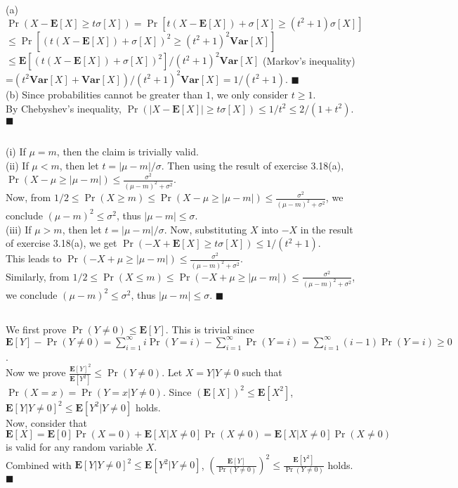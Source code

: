 \documentclass{article}
\begin{document}
\subsection{}
(a) $\Pr(X-\textbf{E}[X]\geq t\sigma[X])=\Pr[t(X-\textbf{E}[X])+\sigma[X]\geq(t^2+1)\sigma[X]]$\\
$\leq\Pr[(t(X-\textbf{E}[X])+\sigma[X])^2\geq(t^2+1)^2\textbf{Var}[X]]$\\
$\leq \textbf{E}[(t(X-\textbf{E}[X])+\sigma[X])^2]/(t^2+1)^2\textbf{Var}[X]$ (Markov's inequality)\\
=$(t^2\textbf{Var}[X]+\textbf{Var}[X])/(t^2+1)^2\textbf{Var}[X]=1/(t^2+1)$. $\blacksquare$\\
(b) Since probabilities cannot be greater than $1$, we only consider $t \geq 1$.\\
By Chebyshev's inequality, $\Pr(|X-\textbf{E}[X]| \geq t\sigma[X]) \leq 1/t^2 \leq 2/(1+t^2)$. $\blacksquare$
\subsection{}
(i) If $\mu=m$, then the claim is trivially valid.\\
(ii) If $\mu < m$, then let $t=|\mu-m|/\sigma$. Then using the result of exercise 3.18(a), $\Pr(X-\mu \geq |\mu-m|) \leq \frac{\sigma^2}{(\mu-m)^2+\sigma^2}$.\\
Now, from $1/2 \leq \Pr(X\geq m) \leq \Pr(X-\mu\geq|\mu-m|) \leq \frac{\sigma^2}{(\mu-m)^2+\sigma^2}$,
we conclude $(\mu-m)^2 \leq \sigma^2$, thus $|\mu-m| \leq \sigma$.\\
(iii) If $\mu > m$, then let $t=|\mu-m|/\sigma$.
Now, substituting $X$ into $-X$ in the result of exercise 3.18(a), we get $\Pr(-X + \textbf{E}[X] \geq t\sigma[X]) \leq 1/(t^2+1)$.\\
This leads to $\Pr(-X+\mu \geq |\mu-m|) \leq \frac{\sigma^2}{(\mu-m)^2+\sigma^2}$.\\
Similarly, from $1/2 \leq \Pr(X\leq m) \leq \Pr(-X+\mu\geq|\mu-m|) \leq \frac{\sigma^2}{(\mu-m)^2+\sigma^2}$,
we conclude $(\mu-m)^2 \leq \sigma^2$, thus $|\mu-m| \leq \sigma$. $\blacksquare$
\subsection{}
We first prove $\Pr(Y\neq 0) \leq \textbf{E}[Y]$. This is trivial since\\
$\textbf{E}[Y]-\Pr(Y\neq 0)=\sum\limits_{i=1}^\infty i\Pr(Y=i)-\sum\limits_{i=1}^\infty \Pr(Y=i)=\sum\limits_{i=1}^\infty(i-1)\Pr(Y=i)\geq 0$.\\
Now we prove $\frac{\textbf{E}[Y]^2}{\textbf{E}[Y^2]} \leq \Pr(Y\neq 0)$.
Let $X=Y|Y\neq 0$ such that $\Pr(X=x)=\Pr(Y=x|Y\neq 0)$. Since $(\textbf{E}[X])^2 \leq \textbf{E}[X^2]$, $\textbf{E}[Y|Y\neq 0]^2 \leq \textbf{E}[Y^2|Y\neq 0]$ holds.\\
Now, consider that $\textbf{E}[X]=\textbf{E}[0]\Pr(X=0)+\textbf{E}[X|X\neq0]\Pr(X\neq 0)=\textbf{E}[X|X\neq0]\Pr(X\neq 0)$ is valid for any random variable $X$.\\
Combined with $\textbf{E}[Y|Y\neq 0]^2 \leq \textbf{E}[Y^2|Y\neq 0]$,
$\left(\frac{\textbf{E}[Y]}{\Pr(Y\neq 0)}\right)^2 \leq \frac{\textbf{E}[Y^2]}{\Pr(Y\neq 0)}$ holds. $\blacksquare$
\end{document}
